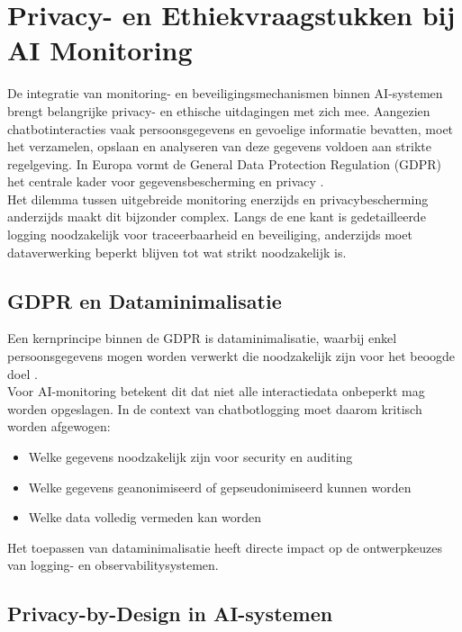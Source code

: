 \section{Privacy- en Ethiekvraagstukken bij AI Monitoring}

De integratie van monitoring- en beveiligingsmechanismen binnen AI-systemen brengt belangrijke privacy- en ethische uitdagingen met zich mee. Aangezien chatbotinteracties vaak persoonsgegevens en gevoelige informatie bevatten, moet het verzamelen, opslaan en analyseren van deze gegevens voldoen aan strikte regelgeving. In Europa vormt de General Data Protection Regulation (GDPR) het centrale kader voor gegevensbescherming en privacy \autocite{gdpr2016}.\\

Het dilemma tussen uitgebreide monitoring enerzijds en privacybescherming anderzijds maakt dit bijzonder complex. Langs de ene kant is gedetailleerde logging noodzakelijk voor traceerbaarheid en beveiliging, anderzijds moet dataverwerking beperkt blijven tot wat strikt noodzakelijk is.

\subsection{GDPR en Dataminimalisatie}

Een kernprincipe binnen de GDPR is dataminimalisatie, waarbij enkel persoonsgegevens mogen worden verwerkt die noodzakelijk zijn voor het beoogde doel \autocite{gdpr2016}. \\

Voor AI-monitoring betekent dit dat niet alle interactiedata onbeperkt mag worden opgeslagen. In de context van chatbotlogging moet daarom kritisch worden afgewogen:

\begin{itemize}
    \item Welke gegevens noodzakelijk zijn voor security en auditing
    \item Welke gegevens geanonimiseerd of gepseudonimiseerd kunnen worden
    \item Welke data volledig vermeden kan worden
\end{itemize}

Het toepassen van dataminimalisatie heeft directe impact op de ontwerpkeuzes van logging- en observabilitysystemen.

\subsection{Privacy-by-Design in AI-systemen}

